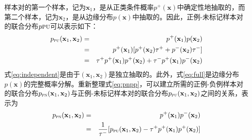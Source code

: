 样本对的第一个样本，记为$\mathbf x_1$，是从正类条件概率$p^+(\mathbf x)$中确定性地抽取的，而第二个样本，记为$\mathbf{x}_2$，是从边缘分布$p(\mathbf{x})$中抽取的。因此，正例-未标记样本对的联合分布$p\textsc{pu}$可以表示如下：
\begin{eqnarray}
	p_\textsc{pu}(\mathbf{x}_1, \mathbf{x}_2) &=& p^+( \mathbf{x}_1) p( \mathbf{x}_2)  \label{eq:independent} \\
	&=& p^+( \mathbf{x}_1) [p^+(\mathbf x_2) \tau^+ +p^-(\mathbf x_2)\tau^- ] \label{eq:full}\\
	&=& \tau^+p^+( \mathbf{x}_1) p^+(\mathbf x_2) + \tau^-p^+( \mathbf{x}_1)p^-(\mathbf x_2) \label{eq:pnpp}
\end{eqnarray}
式\eqref{eq:independent}是由于$(\mathbf{x}_1, \mathbf{x}_2)$是独立抽取的。此外，式\eqref{eq:full}是边缘分布$p(\mathbf{x})$的完整概率分解。重新整理式\eqref{eq:pnpp}，可以建立所需的正例-负例样本对的联合分布$p_\textsc{pn}(\mathbf{x}_1, \mathbf{x}_2)$与正例-未标记样本对的联合分布$p_\textsc{pu}(\mathbf{x}_1, \mathbf{x}_2)$之间的关系，表示为
\begin{eqnarray}\label{eq:jointpn}
	p_\textsc{pn}(\mathbf{x}_1, \mathbf{x}_2)  &=& p^+( \mathbf{x}_1)p^-(\mathbf x_2) \nonumber \\
	&=& \frac{1}{\tau^-}[p_{\textsc{pu}}(\mathbf{x}_1, \mathbf{x}_2)- \tau^+p^+( \mathbf{x}_1) p^+(\mathbf x_2)] \label{eq:pndist}
\end{eqnarray}


